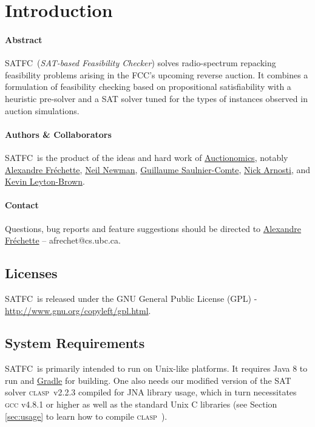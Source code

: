 \documentclass[
10pt, %
letterpaper, %
oneside, %
headinclude,footinclude, %
BCOR5mm, %
needspace, %
]{scrartcl}
\newcommand{\SATFC}{\textsc{SATFC}~}
\newcommand{\clasp}{\textsc{clasp}~}
\begin{document}
\section{Introduction}

\paragraph{Abstract} \SATFC (\emph{SAT-based Feasibility Checker}) solves radio-spectrum repacking feasibility problems arising in the FCC's upcoming reverse auction. It combines a formulation of feasibility checking based on propositional satisfiability with a heuristic pre-solver and a SAT solver tuned for the types of instances observed in auction simulations.

\paragraph{Authors \& Collaborators}  \SATFC is the product of the ideas and hard work of \href{http://www.auctionomics.com/}{Auctionomics}, notably \href{http://www.cs.ubc.ca/~afrechet/}{Alexandre Fr\'echette}, \href{http://www.cs.ubc.ca/~newmanne/}{Neil Newman}, \href{http://www.cs.mcgill.ca/~gsauln/}{Guillaume Saulnier-Comte}, \href{http://web.stanford.edu/~narnosti/}{Nick Arnosti}, and \href{http://www.cs.ubc.ca/~kevinlb/}{Kevin Leyton-Brown}.

\paragraph{Contact} Questions, bug reports and feature suggestions should be directed to \href{mailto:afrechet@cs.ubc.ca}{Alexandre Fr\'echette} -- afrechet@cs.ubc.ca.

\subsection{Licenses}

\SATFC is released under the GNU General Public License (GPL) - \url{http://www.gnu.org/copyleft/gpl.html}.

\subsection{System Requirements}

\SATFC is primarily intended to run on Unix-like platforms. It requires Java 8 to run and \href{http://www.gradle.org/}{Gradle} for building. One also needs our modified version of the SAT solver \clasp v2.2.3 compiled for JNA library usage, which in turn necessitates \textsc{gcc} v4.8.1 or higher as well as the standard Unix C libraries (see Section \ref{sec:usage} to learn how to compile \clasp). 
\end{document}
